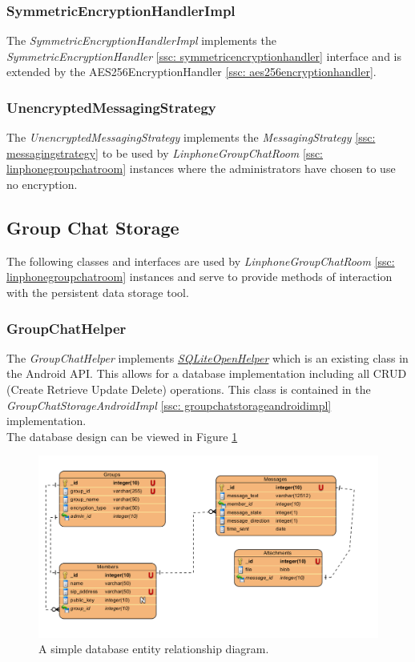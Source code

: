 \documentclass[11pt]{article}
\begin{document}
\subsubsection{SymmetricEncryptionHandlerImpl}\label{ssc: symmetricencryptionhandlerimpl}
The \textit{SymmetricEncryptionHandlerImpl} implements the \textit{SymmetricEncryptionHandler} \ref{ssc: symmetricencryptionhandler} interface and is extended by the AES256EncryptionHandler \ref{ssc: aes256encryptionhandler}.
\subsubsection{UnencryptedMessagingStrategy}\label{unencryptedmessaginstrategy}
The \textit{UnencryptedMessagingStrategy} implements the \textit{MessagingStrategy} \ref{ssc: messagingstrategy} to be used by \textit{LinphoneGroupChatRoom} \ref{ssc: linphonegroupchatroom} instances where the administrators have chosen to use no encryption.


\subsection{Group Chat Storage}\label{subsec: groupchatstorage}
The following classes and interfaces are used by \textit{LinphoneGroupChatRoom} \ref{ssc: linphonegroupchatroom} instances and serve to provide methods of interaction with the persistent data storage tool.
\subsubsection{GroupChatHelper}\label{ssc: groupchathelper}
The \textit{GroupChatHelper} implements \hyperref{http://developer.android.com/reference/android/database/sqlite/SQLiteOpenHelper.html}{Documentation}{SQLiteOpenHelper Official Documentation}{\textit{SQLiteOpenHelper}} which is an existing class in the Android API. This allows for a database implementation including all CRUD (Create Retrieve Update Delete) operations. This class is contained in the \textit{GroupChatStorageAndroidImpl} \ref{ssc: groupchatstorageandroidimpl} implementation.\\
The database design can be viewed in Figure  \ref{cd-database-ERD}\\
\begin{figure}[H]
	\centering
	\includegraphics[width=5in]{./images/database_ERD.png}
	\caption[Database Entity Relationship Diagram]{A simple database entity relationship diagram.}
	\label{cd-database-ERD}
\end{figure}
\end{document}
